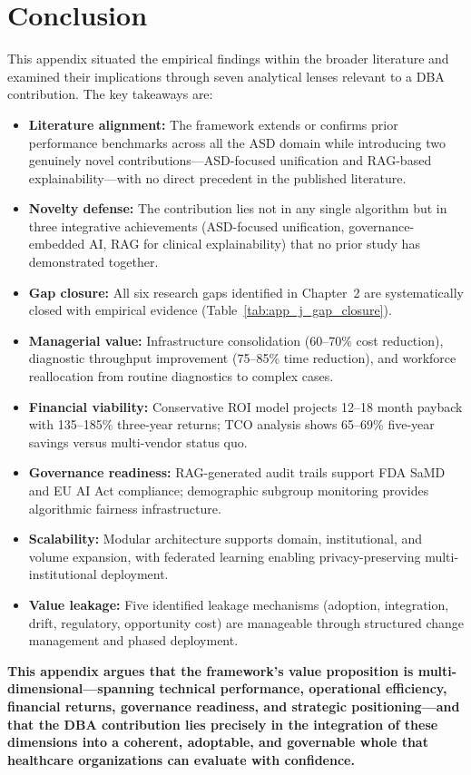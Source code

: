 \section{Conclusion}

This appendix situated the empirical findings within the broader literature and examined their implications through seven analytical lenses relevant to a DBA contribution. The key takeaways are:

\begin{itemize}
    \item \textbf{Literature alignment:} The framework extends or confirms prior performance benchmarks across all the ASD domain while introducing two genuinely novel contributions---ASD-focused unification and RAG-based explainability---with no direct precedent in the published literature.

    \item \textbf{Novelty defense:} The contribution lies not in any single algorithm but in three integrative achievements (ASD-focused unification, governance-embedded AI, RAG for clinical explainability) that no prior study has demonstrated together.

    \item \textbf{Gap closure:} All six research gaps identified in Chapter~2 are systematically closed with empirical evidence (Table~\ref{tab:app_j_gap_closure}).

    \item \textbf{Managerial value:} Infrastructure consolidation (60--70\% cost reduction), diagnostic throughput improvement (75--85\% time reduction), and workforce reallocation from routine diagnostics to complex cases.

    \item \textbf{Financial viability:} Conservative ROI model projects 12--18 month payback with 135--185\% three-year returns; TCO analysis shows 65--69\% five-year savings versus multi-vendor status quo.

    \item \textbf{Governance readiness:} RAG-generated audit trails support FDA SaMD and EU AI Act compliance; demographic subgroup monitoring provides algorithmic fairness infrastructure.

    \item \textbf{Scalability:} Modular architecture supports domain, institutional, and volume expansion, with federated learning enabling privacy-preserving multi-institutional deployment.

    \item \textbf{Value leakage:} Five identified leakage mechanisms (adoption, integration, drift, regulatory, opportunity cost) are manageable through structured change management and phased deployment.
\end{itemize}

\textbf{This appendix argues that the framework's value proposition is multi-dimensional---spanning technical performance, operational efficiency, financial returns, governance readiness, and strategic positioning---and that the DBA contribution lies precisely in the integration of these dimensions into a coherent, adoptable, and governable whole that healthcare organizations can evaluate with confidence.}

